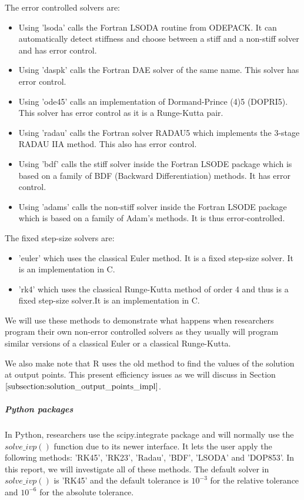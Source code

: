 The error controlled solvers are:
\begin{itemize}
\item Using 'lsoda' calls the Fortran LSODA routine from ODEPACK. It can automatically detect stiffness and choose between a stiff and a non-stiff solver and has error control.
\item Using 'daspk' calls the Fortran DAE solver of the same name. This solver has error control.
\item Using 'ode45' calls an implementation of Dormand-Prince (4)5 (DOPRI5). This solver has error control as it is a Runge-Kutta pair.
\item Using 'radau' calls the Fortran solver RADAU5 which implements the 3-stage RADAU IIA method. This also has error control.
\item Using 'bdf' calls the stiff solver inside the Fortran LSODE package which is based on a family of BDF (Backward Differentiation) methods. It has error control.
\item Using 'adams' calls the non-stiff solver inside the Fortran LSODE package which is based on a family of Adam's methods. It is thus error-controlled. 
\end{itemize}

The fixed step-size solvers are:
\begin{itemize}
\item 'euler' which uses the classical Euler method. It is a fixed step-size solver. It is an implementation in C.
\item 'rk4' which uses the classical Runge-Kutta method of order 4 and thus is a fixed step-size solver.It is an implementation in C. 
\end{itemize}
We will use these methods to demonstrate what happens when researchers program their own non-error controlled solvers as they usually will program similar versions of a classical Euler or a classical Runge-Kutta.

We also make note that R uses the old method to find the values of the solution at output points. This present efficiency issues as we will discuss in Section $\ref{subsection:solution_output_points_impl}$. 

\subparagraph{Python packages}
In Python, researchers use the scipy.integrate package and will normally use the $solve\_ivp()$ function due to its newer interface. It lets the user apply the following methods: 'RK45', 'RK23', 'Radau', 'BDF', 'LSODA' and 'DOP853'. In this report, we will investigate all of these methods. The default solver in $solve\_ivp()$ is 'RK45' and the default tolerance is $10^{-3}$ for the relative tolerance and $10^{-6}$ for the absolute tolerance. 

